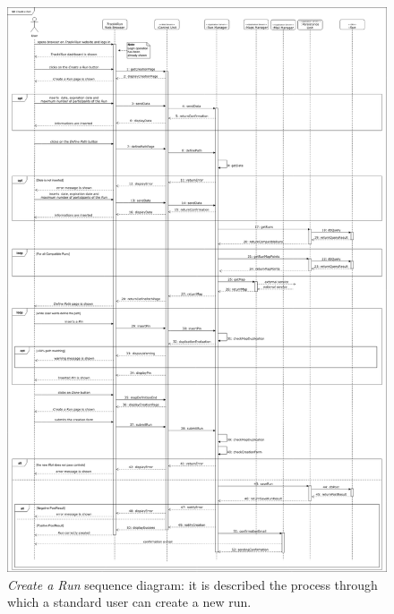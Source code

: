\begin{figure}[H]
  \begin{center}
  	\includegraphics[height=.6\paperheight]{./img/sequence/createRun.png}
    \hspace{0.05\linewidth}
    \centering
    \caption{\textit{Create a Run} sequence diagram: it is described the process through which a standard user can create a new run.}
		\label{img:createRun}
    \end{center}
\end{figure}

